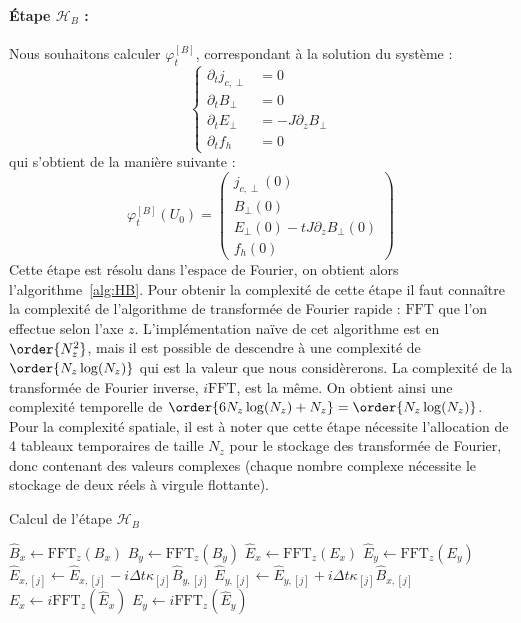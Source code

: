 \paragraph{Étape $\mathcal{H}_B$ :}
Nous souhaitons calculer $\varphi_t^{[B]}$, correspondant à la solution du système :
$$
  \begin{cases}
    \partial_t j_{c,\perp} &= 0 \\
    \partial_t B_\perp     &= 0 \\
    \partial_t E_\perp     &= -J\partial_zB_\perp \\
    \partial_t f_h         &= 0
  \end{cases}
$$
qui s'obtient de la manière suivante :
$$
  \varphi_t^{[B]}(U_0) = \begin{pmatrix}
    j_{c,\perp}(0) \\
    B_\perp(0) \\
    E_\perp(0) - tJ\partial_zB_\perp(0) \\
    f_h(0)
  \end{pmatrix}
$$
Cette étape est résolu dans l'espace de Fourier, on obtient alors l'algorithme~\ref{alg:HB}. Pour obtenir la complexité de cette étape il faut connaître la complexité de l'algorithme de transformée de Fourier rapide : $\text{FFT}$ que l'on effectue selon l'axe $z$. L'implémentation naïve de cet algorithme est en $\order{N_z^2}$, mais il est possible de descendre à une complexité de $\order{N_z\log(N_z)}$ qui est la valeur que nous considèrerons. La complexité de la transformée de Fourier inverse, $i\text{FFT}$, est la même. On obtient ainsi une complexité temporelle de $\order{6N_z\log(N_z)+N_z}=\order{N_z\log(N_z)}$. Pour la complexité spatiale, il est à noter que cette étape nécessite l'allocation de 4 tableaux temporaires de taille $N_z$ pour le stockage des transformée de Fourier, donc contenant des valeurs complexes (chaque nombre complexe nécessite le stockage de deux réels à virgule flottante).
\begin{algorithm}
  \caption{Calcul de l'étape $\mathcal{H}_{B}$}
  \label{alg:HB}
  \begin{algorithmic}[1]
      \State $\hat{B}_x \gets \text{FFT}_z(B_x)$
      \State $\hat{B}_y \gets \text{FFT}_z(B_y)$
      \State $\hat{E}_x \gets \text{FFT}_z(E_x)$
      \State $\hat{E}_y \gets \text{FFT}_z(E_y)$
        \State $\hat{E}_{x,[j]} \gets \hat{E}_{x,[j]} - i\Delta t \kappa_{[j]} \hat{B}_{y,[j]}$
        \State $\hat{E}_{y,[j]} \gets \hat{E}_{y,[j]} + i\Delta t \kappa_{[j]} \hat{B}_{x,[j]}$
      \EndFor
      \State $E_x \gets i\text{FFT}_z(\hat{E}_x)$
      \State $E_y \gets i\text{FFT}_z(\hat{E}_y)$
    \EndFunction
  \end{algorithmic}
\end{algorithm}

